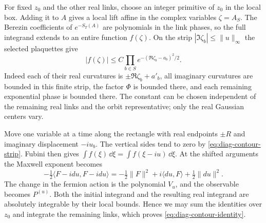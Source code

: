 For fixed $z_0$ and the other real links, choose an integer
primitive of $z_0$ in the local box. Adding it to $A$ gives
a local lift affine in the complex variables $\zeta=A_S$.
The Berezin coefficients of $e^{-S_T(A)}$ are polynomials
in the link phases, so the full integrand extends to an
entire function $f(\zeta)$. On the strip
$|\Im\zeta_b|\le\|u\|_\infty$ the selected plaquettes give
\begin{equation}\label{eq:diag-contour-strip}
 |f(\zeta)|\le C
          \prod_{b\in S}e^{-(\Re\zeta_b-a_b)^2/2}.
\end{equation}
Indeed each of their real curvatures is $\pm\Re\zeta_b+a'_b$,
all imaginary curvatures are bounded in this finite strip,
the factor $\Phi$ is bounded there, and each remaining
exponential phase is bounded there. The constant can be
chosen independent of the remaining real links and the
orbit representative; only the real Gaussian centers vary.

Move one variable at a time along the rectangle with real
endpoints $\pm R$ and imaginary displacement $-iu_b$. The
vertical sides tend to zero by \eqref{eq:diag-contour-strip}.
Fubini then gives $\int f(\xi)\,\dd\xi=
\int f(\xi-iu)\,\dd\xi$. At the shifted arguments the
Maxwell exponent becomes
\[
 -\tfrac12\langle F-idu,F-idu\rangle
       =-\tfrac12\|F\|^2+i\langle du,F\rangle+\tfrac12\|du\|^2.
\]
The change in the fermion action is the polynomial $V_u$,
and the observable becomes $P^{(u)}$. Both the initial
integrand and the resulting real integrand are absolutely
integrable by their local bounds. Hence we may sum the
identities over $z_0$ and integrate the remaining links,
which proves \eqref{eq:diag-contour-identity}.

